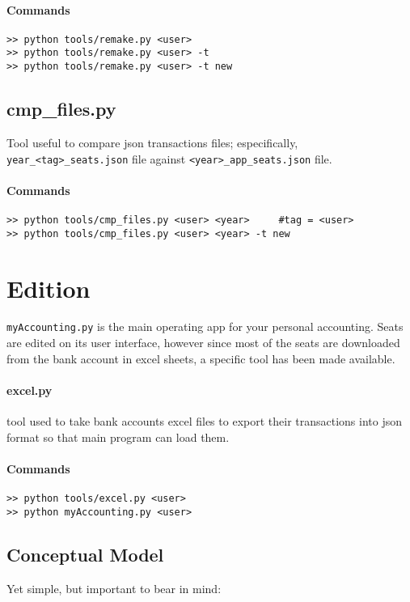 \documentclass[12pt, a4paper]{article}
\begin{document}
\paragraph{Commands}
\begin{verbatim}
>> python tools/remake.py <user>   
>> python tools/remake.py <user> -t     
>> python tools/remake.py <user> -t new  
\end{verbatim}
\subsection{cmp\_files.py} 
Tool useful to compare json transactions files; especifically, \verb!year_<tag>_seats.json! file against \verb!<year>_app_seats.json! file.
\paragraph{Commands}
\begin{verbatim}
>> python tools/cmp_files.py <user> <year>     #tag = <user>
>> python tools/cmp_files.py <user> <year> -t new
\end{verbatim}
  \section{Edition}
  \verb!myAccounting.py! is the main operating app for your personal accounting. 
  Seats are edited on its user interface, however since most of the seats are downloaded from the bank account in excel sheets, a specific tool has been made available.
 \paragraph{excel.py} tool used to take bank accounts excel files to export their transactions into json format so that main program can load them. 
 
 \paragraph{Commands}
 \begin{verbatim}
>> python tools/excel.py <user>
>> python myAccounting.py <user>
\end{verbatim}

 \subsection{Conceptual Model}
 Yet simple, but important to bear in mind:
 
\end{document}
